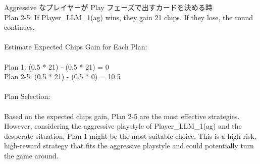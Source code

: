\documentclass{jarticle}     %
\begin{document}
\begin{itembox}[l]{Aggressive なプレイヤーが Play フェーズで出すカードを決める時}
\\Plan 2-5: If Player_LLM_1(ag) wins, they gain 21 chips. If they lose, the round continues.
\\
\\Estimate Expected Chips Gain for Each Plan:
\\
\\Plan 1: (0.5 * 21) - (0.5 * 21) = 0
\\Plan 2-5: (0.5 * 21) - (0.5 * 0) = 10.5
\\
\\Plan Selection:
\\
\\Based on the expected chips gain, Plan 2-5 are the most effective strategies. However, considering the aggressive playstyle of Player_LLM_1(ag) and the desperate situation, Plan 1 might be the most suitable choice. This is a high-risk, high-reward strategy that fits the aggressive playstyle and could potentially turn the game around.
\end{itembox}


\end{document}
